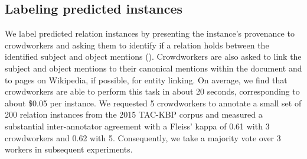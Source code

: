 \subsection{Labeling predicted instances}
We label predicted relation instances by presenting the instance's provenance to crowdworkers
  and asking them to identify if a relation holds between the identified subject and object mentions (). 
  Crowdworkers are also asked to link the subject and object mentions to their canonical mentions within the document and to pages on Wikipedia, if possible, for entity linking.
On average, we find that crowdworkers are able to perform this task in about 20 seconds, corresponding to about \$0.05 per instance.
We requested 5 crowdworkers to annotate a small set of 200 relation instances from the 2015 TAC-KBP corpus 
and measured a substantial inter-annotator agreement with a Fleiss' kappa of 0.61 with 3 crowdworkers and 0.62 with 5. %
Consequently, we take a majority vote over 3 workers in subsequent experiments.

